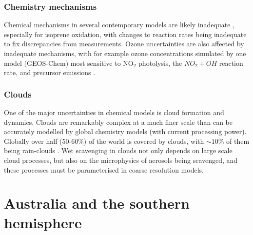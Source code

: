             
    \subsubsection{Chemistry mechanisms}
      \label{LR:Models:Uncert:Chemistry}
      
      
      Chemical mechanisms in several contemporary models are likely inadequate \parencite{Marvin2017}, especially for isoprene oxidation, with changes to reaction rates being inadequate to fix discrepancies from measurements.
      Ozone uncertainties are also affected by inadequate mechanisms, with for example ozone concentrations simulated by one model (GEOS-Chem) most sensitive to NO$_2$ photolysis, the $NO_2 + OH$ reaction rate, and precursor emissions \parencite{Christian2017}.
      
      
    
    \subsubsection{Clouds}
      \label{LR:Models:Uncert:Clouds}
      One of the major uncertainties in chemical models is cloud formation and dynamics.
      Clouds are remarkably complex at a much finer scale than can be accurately modelled by global chemistry models (with current processing power).
      Globally over half (50-60\%) of the world is covered by clouds, with $\sim10\%$ of them being rain-clouds \parencite{Kanakidou2005}.
      Wet scavenging in clouds not only depends on large scale cloud processes, but also on the microphysics of aerosols being scavenged, and these processes must be parameterised in coarse resolution models.
    

\section{Australia and the southern hemisphere}
\label{LR:Aus}
  
